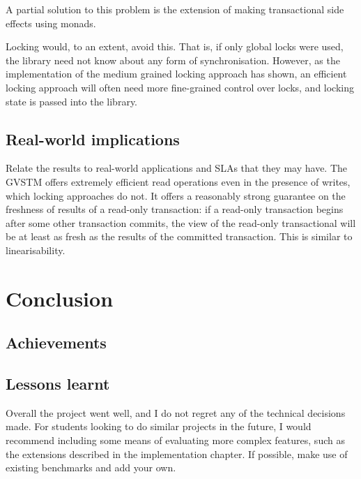 \documentclass[12pt,a4paper,oneside,openright]{report}
\begin{document}
A partial solution to this problem is the extension of making
transactional side effects using monads.

Locking would, to an extent, avoid this. That is, if only global locks
were used, the library need not know about any form of
synchronisation. However, as the implementation of the medium grained
locking approach has shown, an efficient locking approach will often
need more fine-grained control over locks, and locking state is passed
into the library.

\section{Real-world implications}
\label{sec:eval:real-world-impl}

Relate the results to real-world applications and SLAs that they may
have. The GVSTM offers extremely efficient read operations even in the
presence of writes, which locking approaches do not. It offers a
reasonably strong guarantee on the freshness of results of a read-only
transaction: if a read-only transaction begins after some other
transaction commits, the view of the read-only transactional will be
at least as fresh as the results of the committed transaction. This is
similar to linearisability.


\chapter{Conclusion}

\section{Achievements}
\label{sec:conc:achievements}

\section{Lessons learnt}
\label{sec:conc:lessons-learnt}

Overall the project went well, and I do not regret any of the
technical decisions made. For students looking to do similar projects
in the future, I would recommend including some means of evaluating
more complex features, such as the extensions described in the
implementation chapter. If possible, make use of existing benchmarks
and add your own.
\end{document}
